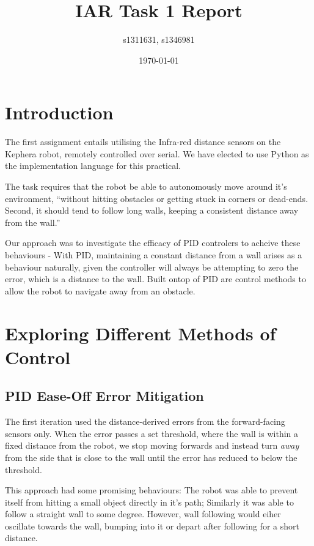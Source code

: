 \documentclass[11pt,a4wide]{article}
\begin{document}
\title{IAR Task 1 Report}
\author{s1311631, s1346981}
\date{\today}
\maketitle


\section{Introduction}

The first assignment entails utilising the Infra-red distance sensors on the Kephera 
robot, remotely controlled over serial. We have elected to use Python as the 
implementation language for this practical.

The task requires that the robot be able to autonomously move around it's environment,
``without hitting obstacles or getting stuck in corners or dead-ends. Second, it should 
tend to follow long walls, keeping a consistent distance away from the wall.''

Our approach was to investigate the efficacy of PID controlers to acheive 
these behaviours - With PID, maintaining a constant distance from a wall arises as
a behaviour naturally, given the controller will always be attempting to zero the 
error, which is a distance to the wall. Built ontop of PID are control methods to
allow the robot to navigate away from an obstacle.

\section{Exploring Different Methods of Control}

\subsection{PID Ease-Off Error Mitigation}


The first iteration used the distance-derived errors from the forward-facing 
sensors only. When the error passes a set threshold, where the wall is within a 
fixed distance from the robot, we stop moving forwards and instead turn \emph{away} 
from the side that is close to the wall until the error has reduced to below the 
threshold.

This approach had some promising behaviours: The robot was able to prevent itself 
from hitting a small object directly in it's path; Similarly it was able to follow 
a straight wall to some degree. However, wall following would eiher oscillate 
towards the wall, bumping into it or depart after following for a short distance. 
\end{document}
